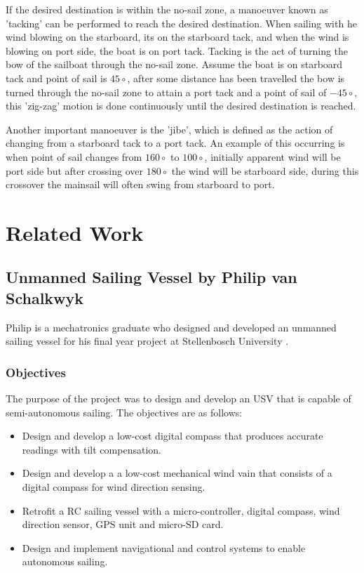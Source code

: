 If the desired destination is within the no-sail zone, a manoeuver known as 'tacking' can be performed to reach the desired destination. When sailing with 
he wind blowing on the starboard, its on the starboard tack, and when the wind is blowing on port side, the boat is on port tack. Tacking is the act of 
turning the bow of the sailboat through the no-sail zone. Assume the boat is on starboard tack and point of sail is $45\circ$, after some distance has been travelled 
the bow is turned through the no-sail zone to attain a port tack and a point of sail of $-45\circ$, this 'zig-zag' motion is done continuously until the 
desired destination is reached.

Another important manoeuver is the 'jibe', which is defined as the action of changing from a starboard tack to a port tack. An example of this occurring is when 
point of sail changes from $160\circ$ to $100\circ$, initially apparent wind will be port side but after crossing over $180\circ$ the wind will be starboard side, 
during this crossover the mainsail will often swing from starboard to port.
\section{Related Work}

\subsection{Unmanned Sailing Vessel by Philip van Schalkwyk}
Philip is a mechatronics graduate who designed and developed an unmanned sailing vessel for his final year project at Stellenbosch University \cite{Phillip}.

\subsubsection{Objectives}
The purpose of the project was to design and develop an USV that is capable of semi-autonomous sailing. The objectives are as follows:

\begin{itemize}
    \item Design and develop a low-cost digital compass that produces accurate readings with tilt compensation.
    \item Design and develop a a low-cost mechanical wind vain that consists of a digital compass for wind direction sensing.
    \item Retrofit a RC sailing vessel with a micro-controller, digital compass, wind direction sensor, GPS unit and micro-SD card.
    \item Design and implement navigational and control systems to enable autonomous sailing.
\end{itemize}

